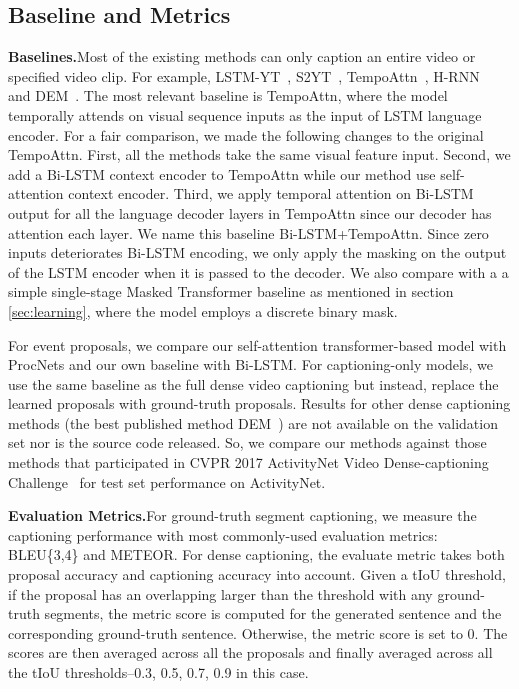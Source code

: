 \documentclass[10pt,twocolumn,letterpaper]{article}
\begin{document}
\subsection{Baseline and Metrics}
\noindent\textbf{Baselines.}\quad Most of the existing methods can only caption an entire video or specified video clip.
For example, LSTM-YT~\cite{venugopalan2014translating}, S2YT~\cite{venugopalan2015sequence}, TempoAttn~\cite{yao2015describing}, H-RNN~\cite{yu2015video} and DEM~\cite{krishna2017dense}.
The most relevant baseline is TempoAttn, where the model temporally attends on visual sequence inputs as the input of LSTM language encoder. For a fair comparison, we made the following changes to the original TempoAttn.
First, all the methods take the same visual feature input. Second, we add a Bi-LSTM context encoder to TempoAttn while our method use self-attention context encoder. Third, we apply temporal attention on Bi-LSTM output for all the language decoder layers in TempoAttn since our decoder has attention each layer. We name this baseline Bi-LSTM+TempoAttn. Since zero inputs deteriorates Bi-LSTM encoding, we only apply the masking on the output of the LSTM encoder when it is passed to the decoder. We also compare with a a simple single-stage Masked Transformer baseline as mentioned in section \ref{sec:learning}, where the model employs a discrete binary mask.  

For event proposals, we compare our self-attention transformer-based model with ProcNets and our own baseline with Bi-LSTM. For captioning-only models, we use the same baseline as the full dense video captioning but instead, replace the learned proposals with ground-truth proposals.
Results for other dense captioning methods (\eg the best published method DEM~\cite{krishna2017dense}) are not available on the validation set nor is the source code released. So, we compare our methods against those methods that participated in CVPR 2017 ActivityNet Video Dense-captioning Challenge~\cite{ghanem2017activitynet} for test set performance on ActivityNet.

\noindent\textbf{Evaluation Metrics.}\quad For ground-truth segment captioning, we measure the captioning performance with most commonly-used evaluation metrics: BLEU\@\{3,4\} and METEOR. For dense captioning, the evaluate metric takes both proposal accuracy and captioning accuracy into account. Given a tIoU threshold, if the proposal has an overlapping larger than the threshold with any ground-truth segments, the metric score is computed for the generated sentence and the corresponding ground-truth sentence. Otherwise, the metric score is set to 0. The scores are then averaged across all the proposals and finally averaged across all the tIoU thresholds--0.3, 0.5, 0.7, 0.9 in this case.
\end{document}
